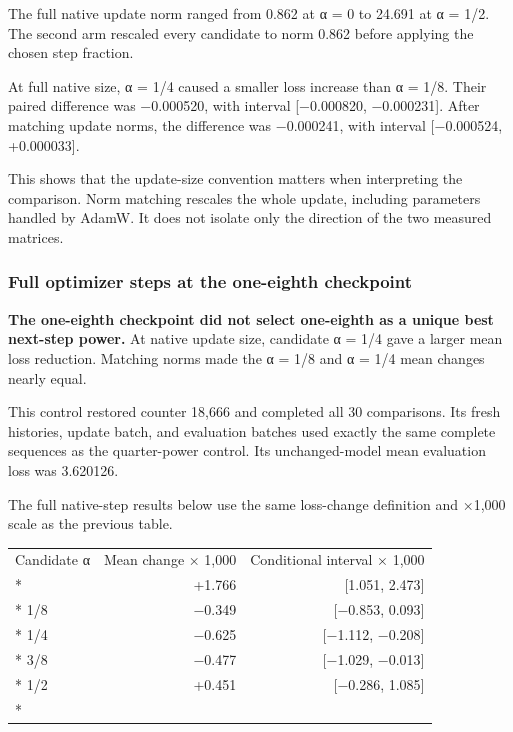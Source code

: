 \documentclass[
  14pt,
  letterpaper,
]{extarticle}
\newcounter{none} %
\begin{document}
The full native update norm ranged from 0.862 at α = 0 to 24.691 at α =
1/2. The second arm rescaled every candidate to norm 0.862 before
applying the chosen step fraction.

At full native size, α = 1/4 caused a smaller loss increase than α =
1/8. Their paired difference was −0.000520, with interval {[}−0.000820,
−0.000231{]}. After matching update norms, the difference was −0.000241,
with interval {[}−0.000524, +0.000033{]}.

This shows that the update-size convention matters when interpreting the
comparison. Norm matching rescales the whole update, including
parameters handled by AdamW. It does not isolate only the direction of
the two measured matrices.

\subsubsection{Full optimizer steps at the one-eighth
checkpoint}\label{full-optimizer-steps-at-the-one-eighth-checkpoint}

\textbf{The one-eighth checkpoint did not select one-eighth as a unique
best next-step power.} At native update size, candidate α = 1/4 gave a
larger mean loss reduction. Matching norms made the α = 1/8 and α = 1/4
mean changes nearly equal.

This control restored counter 18,666 and completed all 30 comparisons.
Its fresh histories, update batch, and evaluation batches used exactly
the same complete sequences as the quarter-power control. Its
unchanged-model mean evaluation loss was 3.620126.

The full native-step results below use the same loss-change definition
and ×1,000 scale as the previous table.

{\def\LTcaptype{none} %
\begin{longtable}[]{@{}lrr@{}}
\toprule\noalign{}
Candidate α & Mean change × 1,000 & Conditional interval × 1,000 \\*
\midrule\noalign{}
\endhead
\bottomrule\noalign{}
\endlastfoot
0 & +1.766 & {[}1.051, 2.473{]} \\*
1/8 & −0.349 & {[}−0.853, 0.093{]} \\*
1/4 & −0.625 & {[}−1.112, −0.208{]} \\*
3/8 & −0.477 & {[}−1.029, −0.013{]} \\*
1/2 & +0.451 & {[}−0.286, 1.085{]} \\*
\end{longtable}
}
\end{document}
